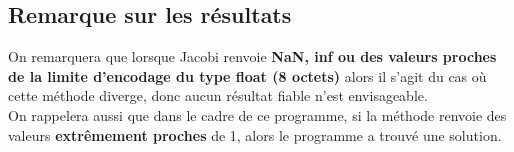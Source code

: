 \subsection{Remarque sur les résultats}
On remarquera que lorsque Jacobi renvoie \textbf{NaN, inf ou des valeurs proches de la limite d'encodage du type float (8 octets)} alors il s'agit du cas où cette méthode diverge, donc aucun résultat fiable n'est envisageable.\\
On rappelera aussi que dans le cadre de ce programme, si la méthode renvoie des valeurs \textbf{extrêmement proches} de 1, alors le programme a trouvé une solution. 